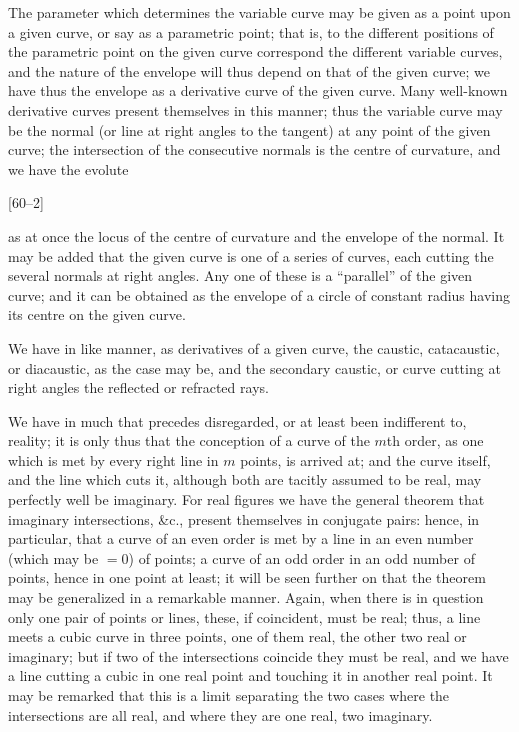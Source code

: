 \documentclass[12pt,a4paper,oneside]{book}
\newcommand{\paperref}[1]{\par\noindent\hfill[#1]\hfill\null\par}
\begin{document}
The parameter which determines the variable curve may be given as a point upon a given curve, or say as a parametric point; that is, to the different positions of the parametric point on the given curve correspond the different variable curves, and the nature of the envelope will thus depend on that of the given curve; we have thus the envelope as a derivative curve of the given curve. Many well-known derivative curves present themselves in this manner; thus the variable curve may be the normal (or line at right angles to the tangent) at any point of the given curve; the intersection of the consecutive normals is the centre of curvature, and we have the evolute

\paperref{60--2}
\newpage

as at once the locus of the centre of curvature and the envelope of the normal. It may be added that the given curve is one of a series of curves, each cutting the several normals at right angles. Any one of these is a ``parallel'' of the given curve; and it can be obtained as the envelope of a circle of constant radius having its centre on the given curve.

We have in like manner, as derivatives of a given curve, the caustic, catacaustic, or diacaustic, as the case may be, and the secondary caustic, or curve cutting at right angles the reflected or refracted rays.

We have in much that precedes disregarded, or at least been indifferent to, reality; it is only thus that the conception of a curve of the $m$th order, as one which is met by every right line in $m$ points, is arrived at; and the curve itself, and the line which cuts it, although both are tacitly assumed to be real, may perfectly well be imaginary. For real figures we have the general theorem that imaginary intersections, \&c., present themselves in conjugate pairs: hence, in particular, that a curve of an even order is met by a line in an even number (which may be $=0$) of points; a curve of an odd order in an odd number of points, hence in one point at least; it will be seen further on that the theorem may be generalized in a remarkable manner. Again, when there is in question only one pair of points or lines, these, if coincident, must be real; thus, a line meets a cubic curve in three points, one of them real, the other two real or imaginary; but if two of the intersections coincide they must be real, and we have a line cutting a cubic in one real point and touching it in another real point. It may be remarked that this is a limit separating the two cases where the intersections are all real, and where they are one real, two imaginary.
\end{document}
